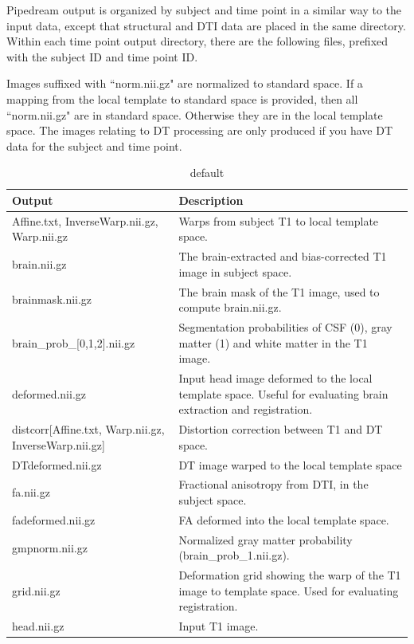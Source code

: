 \documentclass{InsightArticle}
\begin{document}
Pipedream output is organized by subject and time point in a similar way to the input data, except that structural and DTI data are placed in the same directory. Within each time point output directory, there are the following files, prefixed with the subject ID and time point ID.

Images suffixed with ``norm.nii.gz" are normalized to standard space. If a mapping from the local template to standard space is provided, then all ``norm.nii.gz" are in standard space. Otherwise they are in the local template space. The images relating to DT processing are only produced if you have DT data for the subject and time point.

\begin{table}[htdp]
\caption{default}
\begin{center}
\begin{tabular}{| p{5cm} | p{10cm} |}
\hline
\textbf{Output} & \textbf{Description} \\ \hline
Affine.txt, InverseWarp.nii.gz, Warp.nii.gz & Warps from subject T1 to local template space. \\ \hline
brain.nii.gz & The brain-extracted and bias-corrected T1 image in subject space. \\ \hline
brainmask.nii.gz & The brain mask of the T1 image, used to compute brain.nii.gz. \\ \hline
brain\_prob\_[0,1,2].nii.gz & Segmentation probabilities of CSF (0), gray matter (1) and white matter in the T1 image. \\ \hline
deformed.nii.gz & Input head image deformed to the local template space. Useful for evaluating brain extraction and registration. \\ \hline
distcorr[Affine.txt, Warp.nii.gz, InverseWarp.nii.gz] & Distortion correction between T1 and DT space.\\ \hline
DTdeformed.nii.gz & DT image warped to the local template space \\ \hline
fa.nii.gz & Fractional anisotropy from DTI, in the subject space. \\ \hline
fadeformed.nii.gz & FA deformed into the local template space. \\ \hline
gmpnorm.nii.gz         & Normalized gray matter probability (brain\_prob\_1.nii.gz). \\ \hline
grid.nii.gz & Deformation grid showing the warp of the T1 image to template space. Used for evaluating registration. \\ \hline
head.nii.gz & Input T1 image. \\ \hline

\end{tabular}
\end{center}
\end{table}
\end{document}
